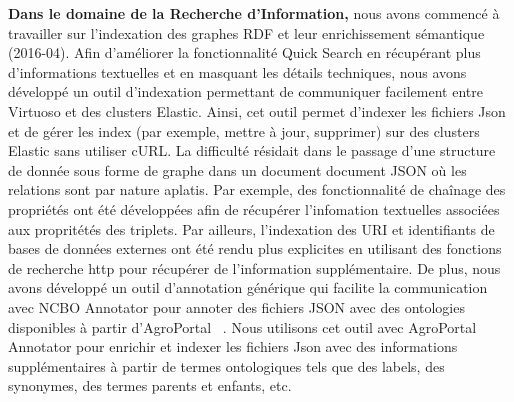 \textbf{Dans le domaine de la Recherche d’Information,} nous avons commencé à travailler sur l’indexation des graphes RDF et leur enrichissement sémantique (2016-04). Afin d'améliorer la fonctionnalité Quick Search en récupérant plus d'informations textuelles et en masquant les détails techniques, nous avons développé un outil d'indexation permettant de communiquer facilement entre Virtuoso et des clusters Elastic. Ainsi, cet outil permet d’indexer les fichiers Json et de gérer les index (par exemple, mettre à jour, supprimer) sur des clusters Elastic sans utiliser cURL. La difficulté résidait dans le passage d'une structure de donnée sous forme de graphe dans un document document JSON où les relations sont par nature aplatis. Par exemple, des fonctionnalité de chaînage des propriétés ont été développées afin de récupérer l'infomation textuelles associées aux propritétés des triplets. Par ailleurs, l'indexation des URI et identifiants de bases de données externes ont été rendu plus explicites en utilisant des fonctions de recherche http pour récupérer de l'information supplémentaire. De plus, nous avons développé un outil d'annotation générique qui facilite la communication avec NCBO Annotator pour annoter des fichiers JSON avec des ontologies disponibles à partir d'AgroPortal ~\cite{Jonquet2018}. Nous utilisons cet outil avec AgroPortal Annotator pour enrichir et indexer les fichiers Json avec des informations supplémentaires à partir de termes ontologiques tels que des labels, des synonymes, des termes parents et enfants, etc.\\


